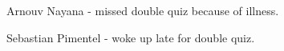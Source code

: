 Arnouv Nayana - missed double quiz because of illness. 

Sebastian Pimentel - woke up late for double quiz. 